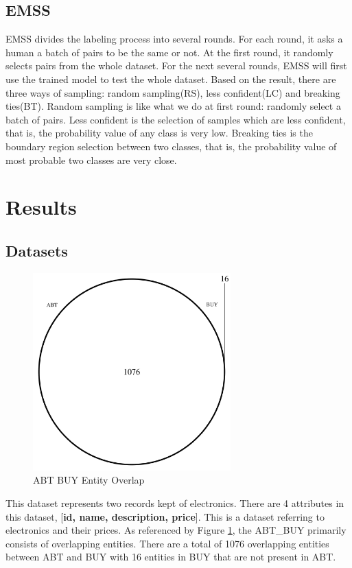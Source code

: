 \documentclass[letterpaper,twocolumn,10pt]{article}
\begin{document}
\subsection{EMSS}
EMSS divides the labeling process into several rounds. For each round, it asks a human a batch of pairs to be the same or not. At the first round, it randomly selects pairs from the whole dataset. For the next several rounds, EMSS will first use the trained model to test the whole dataset. Based on the result, there are three ways of sampling: random sampling(RS), less confident(LC) and breaking ties(BT). Random sampling is like what we do at first round: randomly select a batch of pairs. Less confident is the selection of samples which are less confident, that is, the probability value of any class is very low. Breaking ties is the boundary region selection between two classes, that is, the probability value of most probable two classes are very close.

\section{Results}
\subsection{Datasets}

\begin{figure}[H]
\centering
\includegraphics[width=3in]{figures/abt_buy_venn.png}
\caption{ABT BUY Entity Overlap}
\label{fig:abt-buy-png}
\end{figure}

This dataset represents two records kept of electronics. There are 4 attributes in this dataset, [\textbf{id, name, description, price}]. This is a dataset referring to electronics and their prices. As referenced by Figure \ref{fig:abt-buy-png}, the ABT\_BUY primarily consists of overlapping entities. There are a total of 1076 overlapping entities between ABT and BUY with 16 entities in BUY that are not present in ABT.
\end{document}
